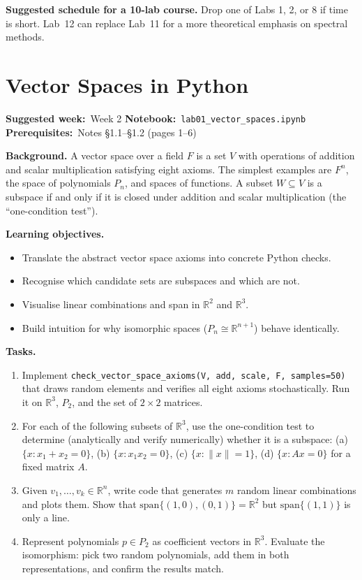 \documentclass[11pt, a4paper]{article}
\newcommand{\labmeta}[3]{%
  \begin{prereqbox}
  \textbf{Suggested week:}~#1 \quad
  \textbf{Notebook:}~\texttt{#2} \quad
  \textbf{Prerequisites:}~#3
  \end{prereqbox}
  \vspace{4pt}
}
\newcommand{\objectives}[1]{%
  \textbf{\color{prereqcolor}Learning objectives.}\vspace{2pt}
  \begin{itemize}[leftmargin=1.6em, itemsep=1pt] #1 \end{itemize}
}
\newcommand{\tasks}[1]{%
  \begin{taskbox}
  \textbf{\color{taskcolor}Tasks.}
  \begin{enumerate}[leftmargin=1.6em, itemsep=3pt] #1 \end{enumerate}
  \end{taskbox}
}
\begin{document}
\vspace{12pt}

\noindent\textbf{Suggested schedule for a 10-lab course.}
Drop one of Labs 1, 2, or 8 if time is short. Lab~12 can replace Lab~11 for
a more theoretical emphasis on spectral methods.

\newpage

\section{Vector Spaces in Python}
\label{lab:vecspaces}

\labmeta{Week 2}{lab01\_vector\_spaces.ipynb}{Notes §1.1--§1.2 (pages 1--6)}

\vspace{4pt}

\noindent\textbf{Background.}
A vector space over a field $F$ is a set $V$ with operations of addition and
scalar multiplication satisfying eight axioms. The simplest examples are
$F^n$, the space of polynomials $P_n$, and spaces of functions. A subset
$W \subseteq V$ is a subspace if and only if it is closed under addition and
scalar multiplication (the ``one-condition test'').

\objectives{
  \item Translate the abstract vector space axioms into concrete Python checks.
  \item Recognise which candidate sets are subspaces and which are not.
  \item Visualise linear combinations and span in $\mathbb{R}^2$ and $\mathbb{R}^3$.
  \item Build intuition for why isomorphic spaces ($P_n \cong \mathbb{R}^{n+1}$) behave identically.
}

\tasks{
  \item Implement \texttt{check\_vector\_space\_axioms(V, add, scale, F, samples=50)}
        that draws random elements and verifies all eight axioms stochastically.
        Run it on $\mathbb{R}^3$, $P_2$, and the set of $2\times 2$ matrices.
  \item For each of the following subsets of $\mathbb{R}^3$, use the one-condition
        test to determine (analytically and verify numerically) whether it is a
        subspace: (a) $\{x : x_1 + x_2 = 0\}$, (b) $\{x : x_1 x_2 = 0\}$,
        (c) $\{x : \|x\| = 1\}$, (d) $\{x : Ax = 0\}$ for a fixed matrix $A$.
  \item Given $v_1, \ldots, v_k \in \mathbb{R}^n$, write code that generates
        $m$ random linear combinations and plots them.  Show that
        $\mathrm{span}\{(1,0),(0,1)\} = \mathbb{R}^2$ but
        $\mathrm{span}\{(1,1)\}$ is only a line.
  \item Represent polynomials $p \in P_2$ as coefficient vectors in
        $\mathbb{R}^3$.  Evaluate the isomorphism: pick two random polynomials,
        add them in both representations, and confirm the results match.
}
\end{document}
